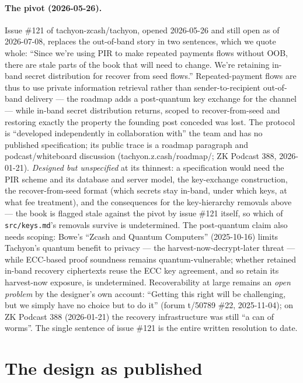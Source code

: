 \documentclass[11pt,a4paper]{article}
\theoremstyle{definition}
\begin{document}
\paragraph{The pivot (2026-05-26).} Issue \#121 of tachyon-zcash/tachyon,
opened 2026-05-26 and still open as of 2026-07-08, replaces the out-of-band
story in two sentences, which we quote whole:
``Since we're using PIR to make repeated payments flows without OOB, there
are stale parts of the book that will need to change. We're retaining
in-band secret distribution for recover from seed flows.'' Repeated-payment
flows are thus to use private information retrieval rather than
sender-to-recipient out-of-band delivery --- the roadmap adds a post-quantum
key exchange for the channel --- while in-band secret distribution returns,
scoped to recover-from-seed and restoring exactly the property the founding
post conceded was lost. The protocol is ``developed independently in
collaboration with'' the team and has no published specification; its
public trace is a roadmap paragraph and podcast/whiteboard discussion
(tachyon.z.cash/roadmap/; ZK Podcast 388, 2026-01-21). \emph{Designed but
unspecified} at its thinnest: a specification would need the PIR scheme and
its database and server model, the key-exchange construction, the
recover-from-seed format (which secrets stay in-band, under which keys, at
what fee treatment), and the consequences for the key-hierarchy removals
above --- the book is flagged stale against the pivot by issue \#121
itself, so which of \texttt{src/keys.md}'s removals survive is
undetermined. The post-quantum claim also needs scoping: Bowe's ``Zcash and
Quantum Computers'' (2025-10-16) limits Tachyon's quantum benefit to privacy
--- the harvest-now-decrypt-later threat --- while ECC-based proof soundness
remains quantum-vulnerable; whether retained in-band recovery ciphertexts
reuse the ECC key agreement, and so retain its harvest-now exposure, is
undetermined. Recoverability at large remains an \emph{open problem} by the
designer's own account: ``Getting this right will be challenging, but we
simply have no choice but to do it'' (forum t/50789 \#22, 2025-11-04); on ZK
Podcast 388
(2026-01-21) the recovery infrastructure was still ``a can of worms''. The
single sentence of issue \#121 is the entire written resolution to date.

\section{The design as published}\label{sec:tachyon-design}
\end{document}

